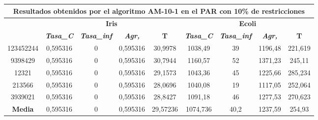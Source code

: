 \documentclass[12pt, spanish]{article}
\begin{document}
\begin{table}[H]
\footnotesize
\begin{tabular}{|c|c|c|c|c|c|c|c|c|}
\hline
\multicolumn{9}{|c|}{\textbf{Resultados obtenidos por el algoritmo AM-10-1 en el PAR con 10\% de restricciones}}                                                                                                  \\ \hline
\multirow{2}{*}{} & \multicolumn{4}{c|}{\textbf{Iris}}                                                            & \multicolumn{4}{c|}{\textbf{Ecoli}}                                                           \\ \cline{2-9} 
                  & \textit{\textbf{Tasa\_C}} & \textit{\textbf{Tasa\_inf}} & \textit{\textbf{Agr,}} & \textbf{T} & \textit{\textbf{Tasa\_C}} & \textit{\textbf{Tasa\_inf}} & \textit{\textbf{Agr,}} & \textbf{T} \\ \hline
123452244         & 0,595316                  & 0                           & 0,595316               & 30,9978    & 1038,49                   & 39                          & 1196,48                & 221,619    \\ \hline
9398429           & 0,595316                  & 0                           & 0,595316               & 30,7944    & 1160,57                   & 52                          & 1371,23                & 245,11     \\ \hline
12321             & 0,595316                  & 0                           & 0,595316               & 29,1573    & 1043,36                   & 45                          & 1225,66                & 285,234    \\ \hline
213566            & 0,595316                  & 0                           & 0,595316               & 28,0696    & 1040,08                   & 19                          & 1117,05                & 252,064    \\ \hline
3939021           & 0,595316                  & 0                           & 0,595316               & 28,8427    & 1091,18                   & 46                          & 1277,53                & 270,623    \\ \hline
\textbf{Media}    & 0,595316                  & 0                           & 0,595316               & 29,57236   & 1074,736                  & 40,2                        & 1237,59                & 254,93     \\ \hline
\end{tabular}
\end{table}
\end{document}
